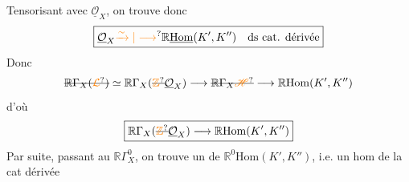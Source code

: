 Tensorisant avec $\underline{\mathcal O}_X$, on trouve
 donc
\[
 \boxed{\underline{\mathcal O}_X\unsure{\xrightarrow{\sim}|\longrightarrow}
 \mathbb R\underline{\mathrm{Hom}}(K',K'')\quad\text{ds cat. dérivée}}
\]
Donc
\[
 \deleted{\mathbb R\Gamma_X(\unsure{\mathcal L})}\simeq
 \mathbb R\Gamma_X(\deleted{\unsure{\mathbb Z}}\underline{\mathcal O}_X)\longrightarrow
 \deleted{\mathbb R\Gamma_X\unsure{\mathscr H}}\longrightarrow\mathbb R\mathrm{Hom}(K',K'')
\]
d'où
\[
 \boxed{\mathbb R\Gamma_X(\deleted{\unsure{\mathbb Z}}\underline{\mathcal O}_X)\longrightarrow\mathbb R\mathrm{Hom}(K',K'')}
\]
Par suite,  passant au $\mathbb R\Gamma^0_X$, on trouve un  de $\mathbb R^0\mathrm{Hom}(K',K'')$, i.e. un hom de la cat dérivée
